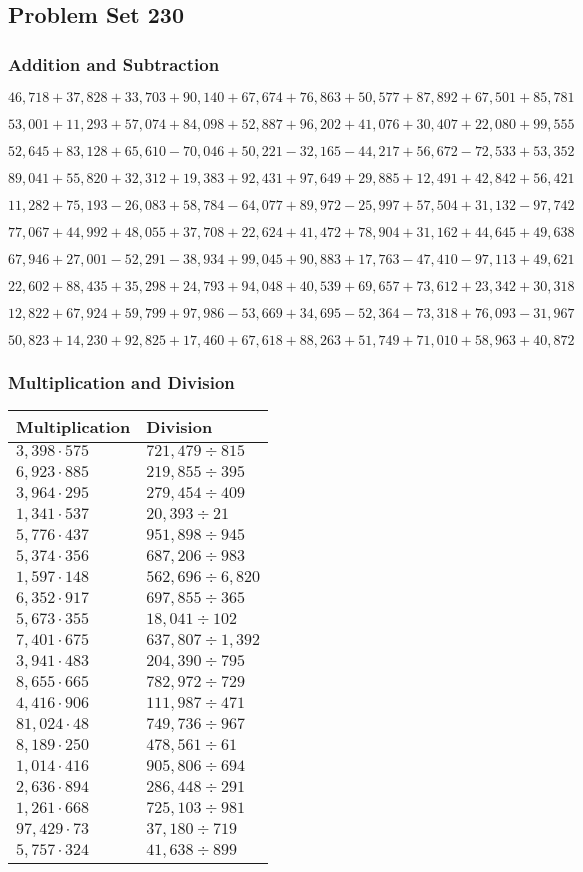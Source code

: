 \hypertarget{problem-set-230}{%
\subsection{Problem Set 230}\label{problem-set-230}}

\hypertarget{addition-and-subtraction}{%
\subsubsection{Addition and
Subtraction}\label{addition-and-subtraction}}

\(46,718+37,828+33,703+90,140+67,674+76,863+50,577+87,892+67,501+85,781\)

\(53,001+11,293+57,074+84,098+52,887+96,202+41,076+30,407+22,080+99,555\)

\(52,645+83,128+65,610-70,046+50,221-32,165-44,217+56,672-72,533+53,352\)

\(89,041+55,820+32,312+19,383+92,431+97,649+29,885+12,491+42,842+56,421\)

\(11,282+75,193-26,083+58,784-64,077+89,972-25,997+57,504+31,132-97,742\)

\(77,067+44,992+48,055+37,708+22,624+41,472+78,904+31,162+44,645+49,638\)

\(67,946+27,001-52,291-38,934+99,045+90,883+17,763-47,410-97,113+49,621\)

\(22,602+88,435+35,298+24,793+94,048+40,539+69,657+73,612+23,342+30,318\)

\(12,822+67,924+59,799+97,986-53,669+34,695-52,364-73,318+76,093-31,967\)

\(50,823+14,230+92,825+17,460+67,618+88,263+51,749+71,010+58,963+40,872\)

\hypertarget{multiplication-and-division}{%
\subsubsection{Multiplication and
Division}\label{multiplication-and-division}}

\begin{longtable}[]{@{}ll@{}}
\toprule
Multiplication & Division\tabularnewline
\midrule
\endhead
\(3,398\cdot575\) & \(721,479 ÷815\)\tabularnewline
\(6,923\cdot885\) & \(219,855÷395\)\tabularnewline
\(3,964\cdot295\) & \(279,454÷409\)\tabularnewline
\(1,341\cdot537\) & \(20,393÷21\)\tabularnewline
\(5,776\cdot437\) & \(951,898÷945\)\tabularnewline
\(5,374\cdot356\) & \(687,206÷983\)\tabularnewline
\(1,597\cdot148\) & \(562,696÷6,820\)\tabularnewline
\(6,352\cdot917\) & \(697,855÷365\)\tabularnewline
\(5,673\cdot355\) & \(18,041÷102\)\tabularnewline
\(7,401\cdot675\) & \(637,807÷1,392\)\tabularnewline
\(3,941\cdot483\) & \(204,390÷795\)\tabularnewline
\(8,655\cdot665\) & \(782,972÷729\)\tabularnewline
\(4,416\cdot906\) & \(111,987÷471\)\tabularnewline
\(81,024\cdot48\) & \(749,736÷967\)\tabularnewline
\(8,189\cdot250\) & \(478,561÷61\)\tabularnewline
\(1,014\cdot416\) & \(905,806÷694\)\tabularnewline
\(2,636\cdot894\) & \(286,448÷291\)\tabularnewline
\(1,261\cdot668\) & \(725,103÷981\)\tabularnewline
\(97,429\cdot73\) & \(37,180÷719\)\tabularnewline
\(5,757\cdot324\) & \(41,638÷899\)\tabularnewline
\bottomrule
\end{longtable}
